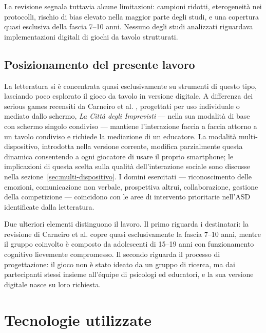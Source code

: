 \documentclass[12pt]{report}
\begin{document}
La revisione segnala tuttavia alcune limitazioni: campioni ridotti, eterogeneità nei protocolli, rischio di bias elevato nella maggior parte degli studi, e una copertura quasi esclusiva della fascia 7--10 anni. Nessuno degli studi analizzati riguardava implementazioni digitali di giochi da tavolo strutturati.

\section{Posizionamento del presente lavoro}

La letteratura si è concentrata quasi esclusivamente su strumenti di questo tipo, lasciando poco esplorato il gioco da tavolo in versione digitale. A differenza dei serious games recensiti da Carneiro et al. \cite{carneiro2024}, progettati per uso individuale o mediato dallo schermo, \textit{La Città degli Imprevisti} --- nella sua modalità di base con schermo singolo condiviso --- mantiene l'interazione faccia a faccia attorno a un tavolo condiviso e richiede la mediazione di un educatore. La modalità multi-dispositivo, introdotta nella versione corrente, modifica parzialmente questa dinamica consentendo a ogni giocatore di usare il proprio smartphone; le implicazioni di questa scelta sulla qualità dell'interazione sociale sono discusse nella sezione~\ref{sec:multi-dispositivo}. I domini esercitati --- riconoscimento delle emozioni, comunicazione non verbale, prospettiva altrui, collaborazione, gestione della competizione --- coincidono con le aree di intervento prioritarie nell'ASD identificate dalla letteratura.

Due ulteriori elementi distinguono il lavoro. Il primo riguarda i destinatari: la revisione di Carneiro et al. \cite{carneiro2024} copre quasi esclusivamente la fascia 7--10 anni, mentre il gruppo coinvolto è composto da adolescenti di 15--19 anni con funzionamento cognitivo lievemente compromesso. Il secondo riguarda il processo di progettazione: il gioco non è stato ideato da un gruppo di ricerca, ma dai partecipanti stessi insieme all'équipe di psicologi ed educatori, e la sua versione digitale nasce su loro richiesta.

%
%

\chapter{Tecnologie utilizzate}
\label{cap:tecnologie}
\end{document}
